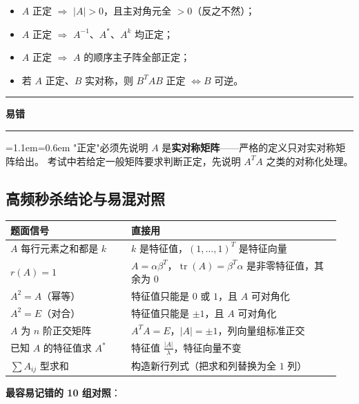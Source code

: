\documentclass[11pt,openany,UTF8]{ctexbook}
\newcommand{\callouthead}[2]{%
  \par\addvspace{7pt}\noindent
  {\color{#1}\rule[-0.15em]{3pt}{1.05em}}\hspace{0.5em}%
  {\bfseries\color{#1}#2}\par\nobreak\vspace{-0.35em}%
  {\color{rulesep}\hrule height 0.4pt}\nobreak\vspace{0.45em}%
  \begingroup\small\setlength{\parindent}{0pt}%
  \leftskip=1.1em\rightskip=0.6em\noindent\ignorespaces}
\newcommand{\calloutend}{\par\endgroup\addvspace{7pt}}
\newenvironment{callwarn}[1]{\callouthead{warnbar}{#1}}{\calloutend}
\begin{document}
\begin{itemize}
\item $A$ 正定 $\Rightarrow$ $\lvert A\rvert>0$，且主对角元全 $>0$（反之不然）；
\item $A$ 正定 $\Rightarrow$ $A^{-1}$、$A^*$、$A^k$ 均正定；
\item $A$ 正定 $\Rightarrow$ $A$ 的顺序主子阵全部正定；
\item 若 $A$ 正定、$B$ 实对称，则 $B^TAB$ 正定 $\iff B$ 可逆。
\end{itemize}
\begin{callwarn}{易错}
"正定"必须先说明 $A$ 是\textbf{实对称矩阵}——严格的定义只对实对称矩阵给出。 考试中若给定一般矩阵要求判断正定，先说明 $A^TA$ 之类的对称化处理。

\end{callwarn}

\subsection{高频秒杀结论与易混对照}

\begingroup\small\setlength{\tabcolsep}{4.0pt}
\begin{longtable}{@{}L{0.3483\linewidth}L{0.5974\linewidth}@{}}
\toprule
\textbf{题面信号} & \textbf{直接用} \\
\midrule
\endhead
$A$ 每行元素之和都是 $k$ & $k$ 是特征值，$(1,\dots,1)^T$ 是特征向量 \\
$r(A)=1$ & $A=\alpha\beta^T$，$\operatorname{tr}(A)=\beta^T\alpha$ 是非零特征值，其余为 $0$ \\
$A^2=A$（幂等） & 特征值只能是 $0$ 或 $1$，且 $A$ 可对角化 \\
$A^2=E$（对合） & 特征值只能是 $\pm1$，且 $A$ 可对角化 \\
$A$ 为 $n$ 阶正交矩阵 & $A^TA=E$，$\lvert A\rvert=\pm1$，列向量组标准正交 \\
已知 $A$ 的特征值求 $A^*$ & 特征值 $\frac{\lvert A\rvert}{\lambda}$，特征向量不变 \\
$\sum A_{ij}$ 型求和 & 构造新行列式（把求和列替换为全 $1$ 列） \\
\bottomrule
\end{longtable}
\endgroup

\textbf{最容易记错的 10 组对照}：
\end{document}
